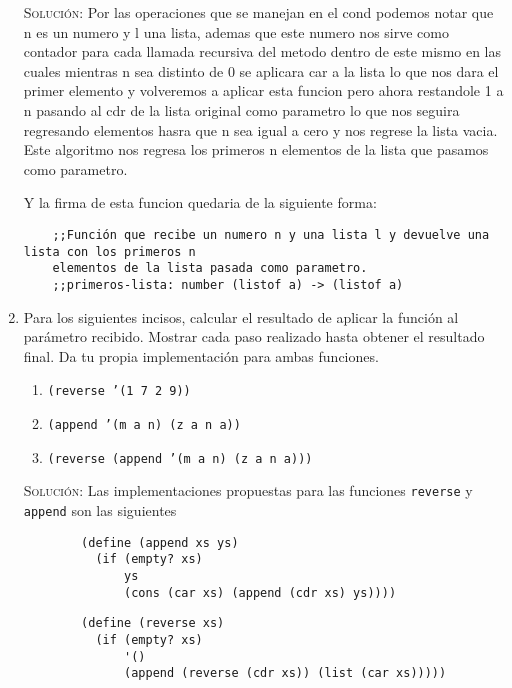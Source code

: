 \documentclass[letterpaper,11pt]{article}
\begin{document}
\begin{enumerate}
    \textsc{Solución:} Por las operaciones que se manejan en el cond podemos notar que n es un numero y l una 
    lista, ademas que este numero nos sirve como contador para cada llamada recursiva del metodo dentro de este 
    mismo en las cuales mientras n sea distinto de 0 se aplicara car a la lista lo que nos dara el primer 
    elemento y volveremos a aplicar esta funcion pero ahora restandole 1 a n pasando al cdr de la lista original 
    como parametro lo que nos seguira regresando elementos hasra que n sea igual a cero y nos regrese la lista 
    vacia. Este algoritmo nos regresa los primeros n elementos de la lista que pasamos como parametro.
    
    Y la firma de esta funcion quedaria de la siguiente forma:
    
    \begin{verbatim}
    ;;Función que recibe un numero n y una lista l y devuelve una lista con los primeros n 
    elementos de la lista pasada como parametro.
    ;;primeros-lista: number (listof a) -> (listof a)
    \end{verbatim}
	
    \item Para los siguientes incisos, calcular el resultado de aplicar la 
    función al parámetro recibido. Mostrar cada paso realizado hasta obtener el 
    resultado final. Da tu propia implementación para ambas funciones.
    \begin{enumerate}
        \item \texttt{(reverse '(1 7 2 9))}
        \item \texttt{(append '(m a n) (z a n a))}
        \item \texttt{(reverse (append '(m a n) (z a n a)))}
    \end{enumerate} 

    \textsc{Solución:} Las implementaciones propuestas para las funciones 
    \texttt{reverse} y \texttt{append} son las siguientes 
    \begin{verbatim}
        (define (append xs ys)
          (if (empty? xs)
              ys
              (cons (car xs) (append (cdr xs) ys))))
    \end{verbatim}
    \begin{verbatim}
        (define (reverse xs)
          (if (empty? xs)
              '()
              (append (reverse (cdr xs)) (list (car xs)))))
    \end{verbatim}


\end{enumerate}
\end{document}

